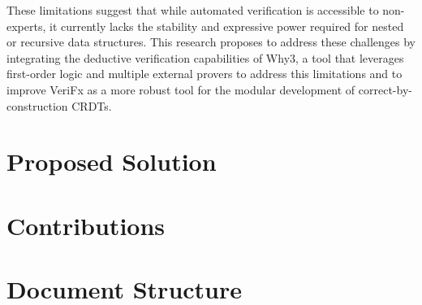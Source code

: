These limitations suggest that while automated verification is accessible to non-experts, it currently lacks the stability and expressive power required for nested or recursive data structures. This research proposes to address these challenges by integrating the deductive verification capabilities of Why3, a tool that leverages first-order logic and multiple external provers to address this limitations and to improve VeriFx as a more robust tool for the modular development of correct-by-construction CRDTs.

\section{Proposed Solution}
\label{sec:solution}


\section{Contributions}
\label{sec:contributions}

\ntindex[Contributions]{}

\section{Document Structure}
\label{sec:structure}


